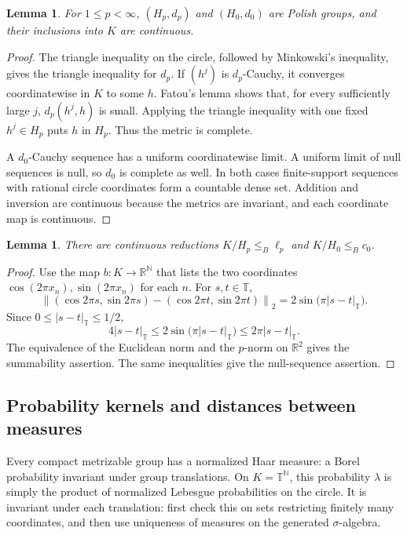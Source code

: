 \documentclass[11pt]{article}
\newtheorem{lemma}[theorem]{Lemma}
\theoremstyle{definition}
\newcommand{\N}{\mathbb N}
\newcommand{\R}{\mathbb R}
\newcommand{\T}{\mathbb T}
\newcommand{\leB}{\mathrel{\leq_B}}
\begin{document}
\begin{lemma}\label{lem:Polish-H}
For $1\le p<\infty$, $(H_p,d_p)$ and $(H_0,d_0)$ are Polish groups,
and their inclusions into $K$ are continuous.
\end{lemma}
\begin{proof}
The triangle inequality on the circle, followed by Minkowski's inequality,
gives the triangle inequality for $d_p$. If $(h^j)$ is $d_p$-Cauchy, it
converges coordinatewise in $K$ to some $h$. Fatou's lemma shows that,
for every sufficiently large $j$, $d_p(h^j,h)$ is small. Applying the
triangle inequality with one fixed $h^j\in H_p$ puts $h$ in $H_p$.
Thus the metric is complete.

A $d_0$-Cauchy sequence has a uniform coordinatewise limit. A uniform
limit of null sequences is null, so $d_0$ is complete as well. In both
cases finite-support sequences with rational circle coordinates form a
countable dense set. Addition and inversion are continuous because the
metrics are invariant, and each coordinate map is continuous.
\end{proof}

\begin{lemma}\label{lem:compact-replacement}
There are continuous reductions $K/H_p\leB \ell_p$ and
$K/H_0\leB c_0$.
\end{lemma}
\begin{proof}
Use the map $b:K\to\R^\N$ that lists the two coordinates
$\cos(2\pi x_n),\sin(2\pi x_n)$ for each $n$. For $s,t\in\T$,
\[
 \left\|(\cos2\pi s,\sin2\pi s)
       -(\cos2\pi t,\sin2\pi t)\right\|_2
 =2\sin\bigl(\pi|s-t|_\T\bigr).
\]
Since $0\le|s-t|_\T\le1/2$,
\[
 4|s-t|_\T\le2\sin\bigl(\pi|s-t|_\T\bigr)
             \le2\pi|s-t|_\T.
\]
The equivalence of the Euclidean norm and the $p$-norm on $\R^2$
gives the summability assertion. The same inequalities give the
null-sequence assertion.
\end{proof}

\subsection{Probability kernels and distances between measures}
Every compact metrizable group has a normalized Haar measure: a Borel
probability invariant under group translations. On $K=\T^\N$, this
probability $\lambda$ is simply the product of normalized Lebesgue
probabilities on the circle. It is invariant under
each translation: first check this on sets restricting finitely many
coordinates, and then use uniqueness of measures on the generated
$\sigma$-algebra.
\end{document}
